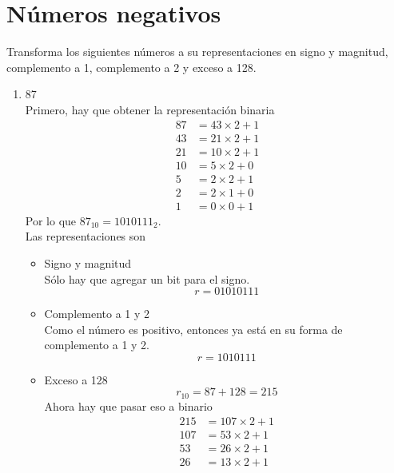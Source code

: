 \documentclass{article}
\begin{document}
    \section{Números negativos}
    Transforma los siguientes números a su representaciones en signo y magnitud,
    complemento a 1, complemento a 2 y exceso a 128.

    \begin{enumerate}
        \item {
            87 \\
            Primero, hay que obtener la representación binaria
            \begin{align*}
                87 &= 43 \times 2 + 1 \\
                43 &= 21 \times 2 + 1 \\
                21 &= 10 \times 2 + 1 \\
                10 &= 5 \times 2 + 0 \\
                5 &= 2 \times 2 + 1 \\
                2 &= 2 \times 1 + 0 \\
                1 &= 0 \times 0 + 1
            \end{align*}
            Por lo que $87_{10} = 1010111_{2}$.\\
            Las representaciones son 
            \begin{itemize}
                \item {
                    Signo y magnitud \\
                    Sólo hay que agregar un bit para el signo.
                    \[r = 01010111\]
                    }
                \item {
                    Complemento a 1 y 2\\
                    Como el número es positivo, entonces ya está
                    en su forma de complemento a 1 y 2.
                    \[r = 1010111\]
                    }
                    \item {
                    Exceso a 128
                    \[r_{10} = 87 + 128 = 215\]
                    Ahora hay que pasar eso a binario
                    \begin{align*}
                        215 &= 107 \times 2 + 1 \\
                        107 &= 53 \times 2 + 1 \\
                        53 &= 26 \times 2 + 1 \\
                        26 &= 13 \times 2 + 1 \\

\end{align*}}
\end{itemize}}
\end{enumerate}
\end{document}
